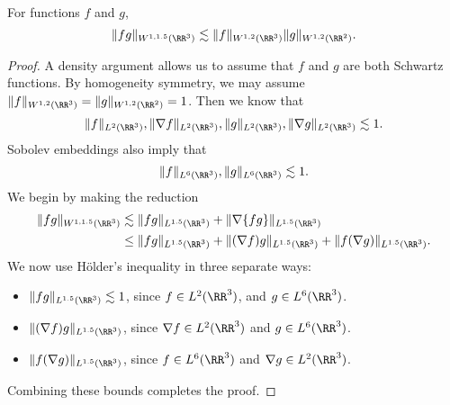 \begin{theorem}
    For functions $f$ and $g$,
    \[ \| fg \|_{W^{1,1.5}(\RR^3)} \lesssim \| f \|_{W^{1,2}(\RR^3)} \| g \|_{W^{1,2}(\RR^2)}. \]
\end{theorem}
\begin{proof}
    A density argument allows us to assume that $f$ and $g$ are both Schwartz functions. By homogeneity symmetry, we may assume $\| f \|_{W^{1,2}(\RR^3)} = \| g \|_{W^{1,2}(\RR^2)} = 1$. Then we know that
    \[ \| f \|_{L^2(\RR^3)}, \| \nabla f \|_{L^2(\RR^3)}, \| g \|_{L^2(\RR^3)}, \| \nabla g \|_{L^2(\RR^3)} \lesssim 1. \]
    Sobolev embeddings also imply that
    \[ \| f \|_{L^6(\RR^3)}, \| g \|_{L^6(\RR^3)} \lesssim 1. \]
    We begin by making the reduction
    \begin{align*}
        \| f g \|_{W^{1,1.5}(\RR^3)} &\lesssim \| f g \|_{L^{1.5}(\RR^3)} + \| \nabla \{ fg \} \|_{L^{1.5}(\RR^3)}\\
        &\leq \| f g \|_{L^{1.5}(\RR^3)} + \| (\nabla f) g \|_{L^{1.5}(\RR^3)} + \| f (\nabla g) \|_{L^{1.5}(\RR^3)}.
    \end{align*}
    We now use H\"{o}lder's inequality in three separate ways:
    \begin{itemize}
        \item $\| f g \|_{L^{1.5}(\RR^3)} \lesssim 1$, since $f \in L^2(\RR^3)$, and $g \in L^6(\RR^3)$.

        \item $\| (\nabla f) g \|_{L^{1.5}(\RR^3)}$, since $\nabla f \in L^2(\RR^3)$ and $g \in L^6(\RR^3)$.

        \item $\| f (\nabla g) \|_{L^{1.5}(\RR^3)}$, since $f \in L^6(\RR^3)$ and $\nabla g \in L^2(\RR^3)$.
    \end{itemize}
    Combining these bounds completes the proof.
\end{proof}


